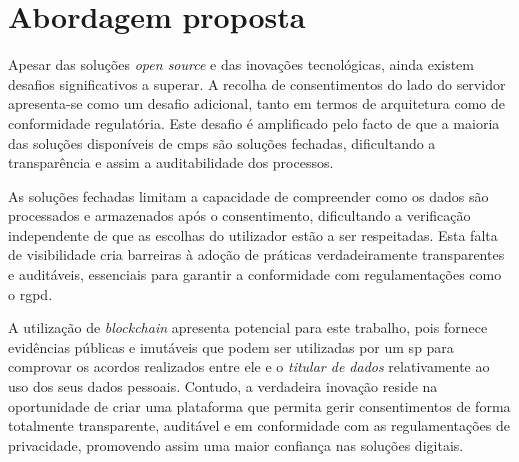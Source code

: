 




\chapter{Abordagem proposta}

Apesar das soluções \textit{open source} e das inovações tecnológicas, ainda existem desafios significativos a superar. A recolha de consentimentos do lado do servidor apresenta-se como um desafio adicional, tanto em termos de arquitetura como de conformidade regulatória. Este desafio é amplificado pelo facto de que a maioria das soluções disponíveis de \acrshort{cmp}s são soluções fechadas, dificultando a transparência e assim a auditabilidade dos processos.

As soluções fechadas limitam a capacidade de compreender como os dados são processados e armazenados após o consentimento, dificultando a verificação independente de que as escolhas do utilizador estão a ser respeitadas. Esta falta de visibilidade cria barreiras à adoção de práticas verdadeiramente transparentes e auditáveis, essenciais para garantir a conformidade com regulamentações como o \acrshort{rgpd}.

A utilização de \textit{blockchain} apresenta potencial para este trabalho, pois fornece evidências públicas e imutáveis que podem ser utilizadas por um \acrshort{sp} para comprovar os acordos realizados entre ele e o \textit{titular de dados} relativamente ao uso dos seus dados pessoais. Contudo, a verdadeira inovação reside na oportunidade de criar uma plataforma que permita gerir consentimentos de forma totalmente transparente, auditável e em conformidade com as regulamentações de privacidade, promovendo assim uma maior confiança nas soluções digitais.

